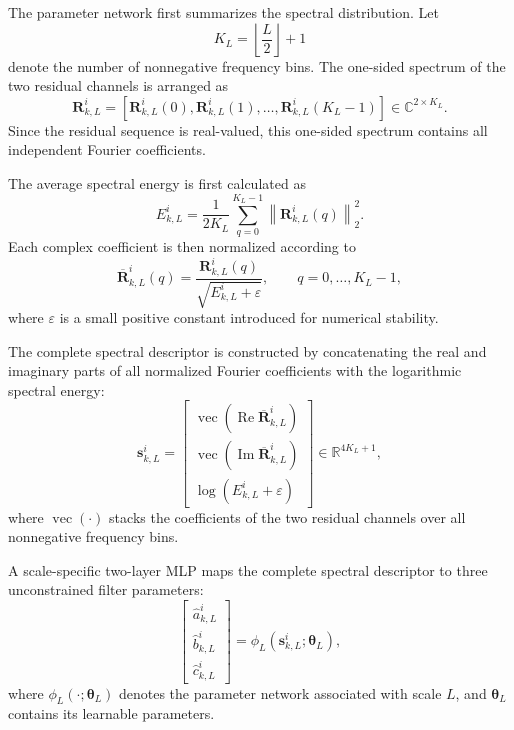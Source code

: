 \documentclass[10pt,doublecolumn]{IEEEtaes}
\begin{document}
The parameter network first summarizes the spectral distribution.   Let
\begin{equation}
	K_L=\left\lfloor \frac{L}{2}\right\rfloor+1
\end{equation}
denote the number of nonnegative frequency bins. The one-sided
spectrum of the two residual channels is arranged as
\begin{equation}
	\mathbf{R}_{k,L}^{i}
	=
	\left[
	\mathbf{R}_{k,L}^{i}(0),
	\mathbf{R}_{k,L}^{i}(1),
	\ldots,
	\mathbf{R}_{k,L}^{i}(K_L-1)
	\right]
	\in\mathbb{C}^{2\times K_L}.
	\label{eq:complete_residual_spectrum}
\end{equation}
Since the residual sequence is real-valued, this one-sided spectrum
contains all independent Fourier coefficients.

The average spectral energy is first calculated as
\begin{equation}
	E_{k,L}^{i}
	=
	\frac{1}{2K_L}
	\sum_{q=0}^{K_L-1}
	\left\|
	\mathbf{R}_{k,L}^{i}(q)
	\right\|_{2}^{2}.
	\label{eq:residual_spectral_energy}
\end{equation}
Each complex coefficient is then normalized according to
\begin{equation}
	\overline{\mathbf{R}}_{k,L}^{i}(q)
	=
	\frac{
		\mathbf{R}_{k,L}^{i}(q)
	}{
		\sqrt{E_{k,L}^{i}+\varepsilon}
	},
	\qquad q=0,\ldots,K_L-1,
	\label{eq:normalized_residual_spectrum}
\end{equation}
where $\varepsilon$ is a small positive constant introduced for
numerical stability.

The complete spectral descriptor is constructed by concatenating the
real and imaginary parts of all normalized Fourier coefficients with
the logarithmic spectral energy:
\begin{equation}
	\mathbf{s}_{k,L}^{i}
	=
	\begin{bmatrix}
		\operatorname{vec}
		\left(
		\operatorname{Re}
		\overline{\mathbf{R}}_{k,L}^{i}
		\right)
		\\[1mm]
		\operatorname{vec}
		\left(
		\operatorname{Im}
		\overline{\mathbf{R}}_{k,L}^{i}
		\right)
		\\[1mm]
		\log\left(E_{k,L}^{i}+\varepsilon\right)
	\end{bmatrix}
	\in\mathbb{R}^{4K_L+1},
	\label{eq:complete_spectral_descriptor}
\end{equation}
where $\operatorname{vec}(\cdot)$ stacks the coefficients of the two
residual channels over all nonnegative frequency bins. 

A scale-specific two-layer MLP maps the complete spectral descriptor
to three unconstrained filter parameters:
\begin{equation}
	\begin{bmatrix}
		\hat a_{k,L}^{i}\\
		\hat b_{k,L}^{i}\\
		\hat c_{k,L}^{i}
	\end{bmatrix}
	=
	\phi_L
	\left(
	\mathbf{s}_{k,L}^{i};
	\boldsymbol{\theta}_L
	\right),
	\label{eq:abc_parameter_network}
\end{equation}
where $\phi_L(\cdot;\boldsymbol{\theta}_L)$ denotes the parameter
network associated with scale $L$, and
$\boldsymbol{\theta}_L$ contains its learnable parameters.
\end{document}
